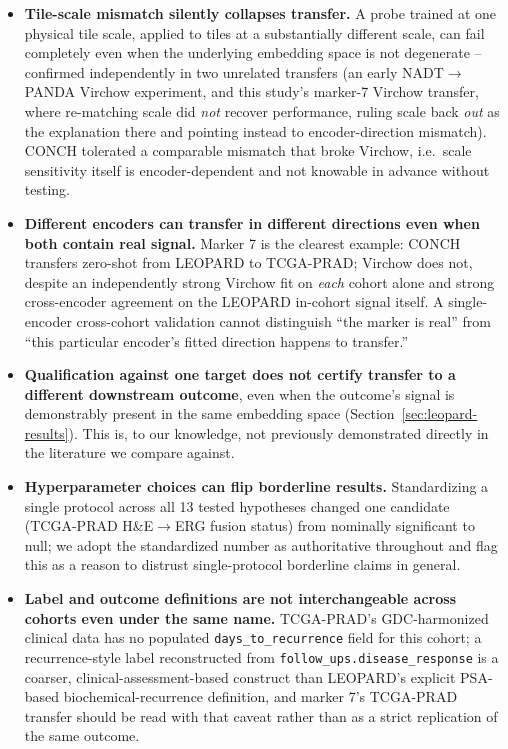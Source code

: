 \begin{itemize}
\item \textbf{Tile-scale mismatch silently collapses transfer.} A probe trained at one
physical tile scale, applied to tiles at a substantially different scale, can fail completely
even when the underlying embedding space is not degenerate -- confirmed independently in two
unrelated transfers (an early NADT$\to$PANDA Virchow experiment, and this study's marker-7
Virchow transfer, where re-matching scale did \emph{not} recover performance, ruling scale
back \emph{out} as the explanation there and pointing instead to encoder-direction mismatch).
CONCH tolerated a comparable mismatch that broke Virchow, i.e.\ scale sensitivity itself is
encoder-dependent and not knowable in advance without testing.
\item \textbf{Different encoders can transfer in different directions even when both contain
real signal.} Marker 7 is the clearest example: CONCH transfers zero-shot from LEOPARD to
TCGA-PRAD; Virchow does not, despite an independently strong Virchow fit on \emph{each} cohort
alone and strong cross-encoder agreement on the LEOPARD in-cohort signal itself. A
single-encoder cross-cohort validation cannot distinguish ``the marker is real'' from ``this
particular encoder's fitted direction happens to transfer.''
\item \textbf{Qualification against one target does not certify transfer to a different
downstream outcome}, even when the outcome's signal is demonstrably present in the same
embedding space (Section~\ref{sec:leopard-results}). This is, to our knowledge, not
previously demonstrated directly in the literature we compare against.
\item \textbf{Hyperparameter choices can flip borderline results.} Standardizing a single
protocol across all 13 tested hypotheses changed one candidate (TCGA-PRAD H\&E$\to$ERG fusion
status) from nominally significant to null; we adopt the standardized number as authoritative
throughout and flag this as a reason to distrust single-protocol borderline claims in general.
\item \textbf{Label and outcome definitions are not interchangeable across cohorts even under
the same name.} TCGA-PRAD's GDC-harmonized clinical data has no populated
\texttt{days\_to\_recurrence} field for this cohort; a recurrence-style label reconstructed
from \texttt{follow\_ups.disease\_response} is a coarser, clinical-assessment-based construct
than LEOPARD's explicit PSA-based biochemical-recurrence definition, and marker 7's TCGA-PRAD
transfer should be read with that caveat rather than as a strict replication of the same
outcome.
\end{itemize}

